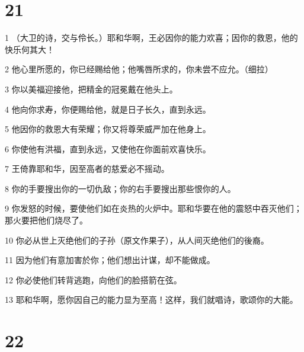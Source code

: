 \chapter{21}

\par 1 （大卫的诗，交与伶长。）耶和华啊，王必因你的能力欢喜；因你的救恩，他的快乐何其大！
\par 2 他心里所愿的，你已经赐给他；他嘴唇所求的，你未尝不应允。（细拉）
\par 3 你以美福迎接他，把精金的冠冕戴在他头上。
\par 4 他向你求寿，你便赐给他，就是日子长久，直到永远。
\par 5 他因你的救恩大有荣耀；你又将尊荣威严加在他身上。
\par 6 你使他有洪福，直到永远，又使他在你面前欢喜快乐。
\par 7 王倚靠耶和华，因至高者的慈爱必不摇动。
\par 8 你的手要搜出你的一切仇敌；你的右手要搜出那些恨你的人。
\par 9 你发怒的时候，要使他们如在炎热的火炉中。耶和华要在他的震怒中吞灭他们；那火要把他们烧尽了。
\par 10 你必从世上灭绝他们的子孙（原文作果子），从人间灭绝他们的後裔。
\par 11 因为他们有意加害於你；他们想出计谋，却不能做成。
\par 12 你必使他们转背逃跑，向他们的脸搭箭在弦。
\par 13 耶和华啊，愿你因自己的能力显为至高！这样，我们就唱诗，歌颂你的大能。

\chapter{22}

